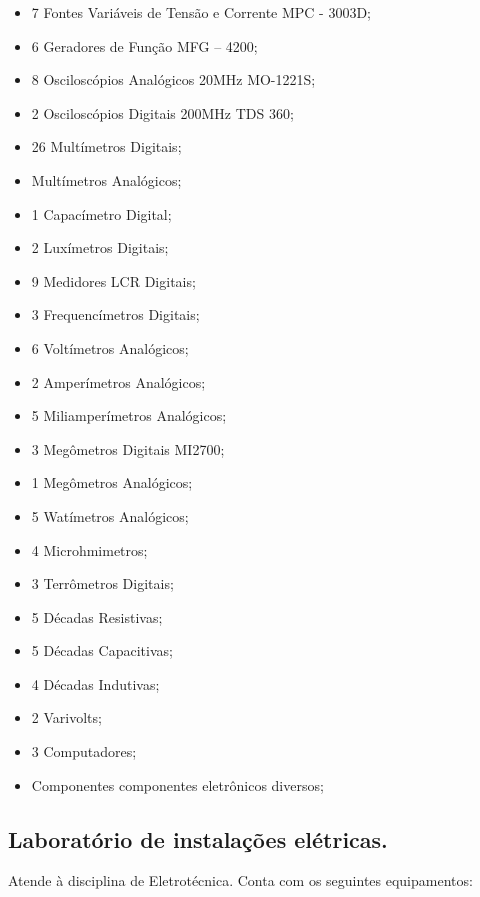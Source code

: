 \begin{itemize}
\item 7 Fontes Variáveis de Tensão e Corrente MPC - 3003D;
\item 6 Geradores de Função MFG – 4200;
\item 8 Osciloscópios Analógicos 20MHz MO-1221S;
\item 2 Osciloscópios Digitais 200MHz TDS 360;
\item 26 Multímetros Digitais;
\item Multímetros Analógicos;
\item 1 Capacímetro Digital;
\item 2 Luxímetros Digitais;
\item 9 Medidores LCR Digitais;
\item 3 Frequencímetros Digitais;
\item 6 Voltímetros Analógicos;
\item 2 Amperímetros Analógicos;
\item 5 Miliamperímetros Analógicos;
\item 3 Megômetros Digitais MI2700;
\item 1 Megômetros Analógicos;
\item 5 Watímetros Analógicos;
\item 4 Microhmimetros;
\item 3 Terrômetros Digitais;
\item 5 Décadas Resistivas;
\item 5 Décadas Capacitivas;
\item 4 Décadas Indutivas;
\item 2 Varivolts;
\item 3 Computadores;
\item Componentes componentes eletrônicos diversos;
\end{itemize}

\subsection{Laboratório de instalações elétricas.}
Atende à disciplina de Eletrotécnica. Conta com os seguintes equipamentos:

